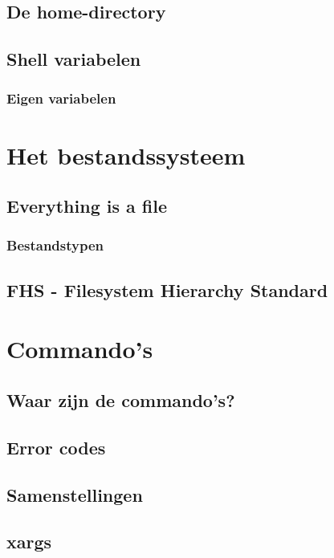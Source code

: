\documentclass[a4paper,12pt,twoside,openright,titlepage]{book}
\begin{document}
\section{De home-directory}

\section{Shell variabelen}

\subsection{Eigen variabelen}


\chapter{Het bestandssysteem}
\section{Everything is a file}

\subsection{Bestandstypen}

\section{FHS - Filesystem Hierarchy Standard}


\chapter{Commando's}

\section{Waar zijn de commando's?}

\section{Error codes}

\section{Samenstellingen}

\section{xargs}

\end{document}
